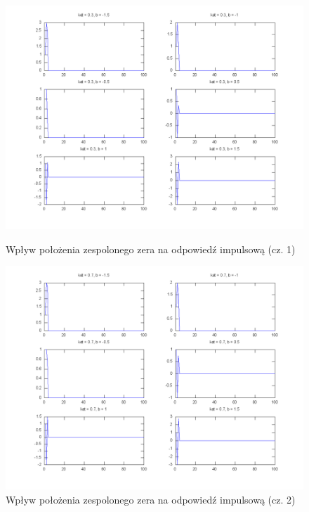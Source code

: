 \documentclass[wide,a4paper,titlepage,12pt]{mwart}
\begin{document}
  \begin{figure}[htbp]
    \begin{center}
      \includegraphics[scale=.3]{out/fig15.png}
      \caption{\label{fig15} Wpływ położenia zespolonego zera na odpowiedź impulsową (cz. 1)}
      \includegraphics[scale=.3]{out/fig16.png}
      \caption{\label{fig16} Wpływ położenia zespolonego zera na odpowiedź impulsową (cz. 2)}

    \end{center}
  \end{figure}
\end{document}
